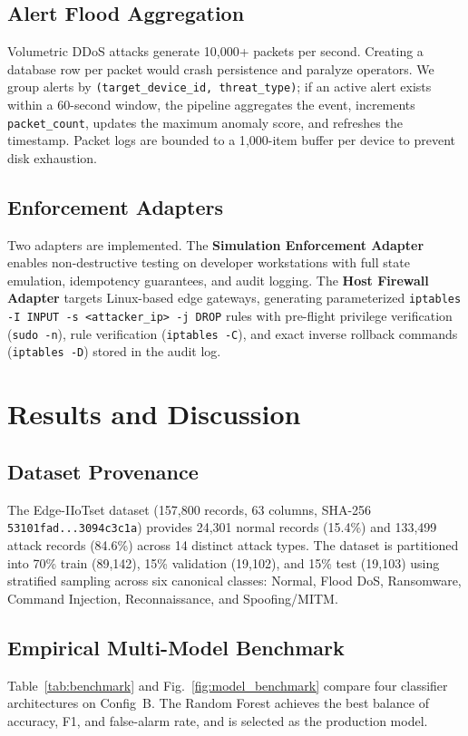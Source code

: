 \documentclass[conference]{IEEEtran}
\begin{document}
\subsection{Alert Flood Aggregation}
Volumetric DDoS attacks generate 10{,}000+ packets per second. Creating a database row per packet would crash persistence and paralyze operators. We group alerts by \texttt{(target\_device\_id, threat\_type)}; if an active alert exists within a 60-second window, the pipeline aggregates the event, increments \texttt{packet\_count}, updates the maximum anomaly score, and refreshes the timestamp. Packet logs are bounded to a 1{,}000-item buffer per device to prevent disk exhaustion.

\subsection{Enforcement Adapters}
Two adapters are implemented. The \textbf{Simulation Enforcement Adapter} enables non-destructive testing on developer workstations with full state emulation, idempotency guarantees, and audit logging. The \textbf{Host Firewall Adapter} targets Linux-based edge gateways, generating parameterized \texttt{iptables -I INPUT -s <attacker\_ip> -j DROP} rules with pre-flight privilege verification (\texttt{sudo -n}), rule verification (\texttt{iptables -C}), and exact inverse rollback commands (\texttt{iptables -D}) stored in the audit log.

\section{Results and Discussion}

\subsection{Dataset Provenance}
The Edge-IIoTset dataset (157,800 records, 63 columns, SHA-256 \texttt{53101fad...3094c3c1a}) provides 24{,}301 normal records (15.4\%) and 133{,}499 attack records (84.6\%) across 14 distinct attack types. The dataset is partitioned into 70\% train (89{,}142), 15\% validation (19{,}102), and 15\% test (19{,}103) using stratified sampling across six canonical classes: Normal, Flood DoS, Ransomware, Command Injection, Reconnaissance, and Spoofing/MITM.

\subsection{Empirical Multi-Model Benchmark}
Table~\ref{tab:benchmark} and Fig.~\ref{fig:model_benchmark} compare four classifier architectures on Config~B. The Random Forest achieves the best balance of accuracy, F1, and false-alarm rate, and is selected as the production model.
\end{document}
